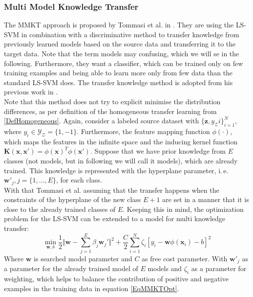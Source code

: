 \subsubsection{Multi Model Knowledge Transfer}
The \acs{MMKT} approach is proposed by Tommasi et al. in \cite{Tommasi.}.
They are using the \ac{LS-SVM} in combination with a discriminative method to transfer knowledge from previously learned models based on the source data and transferring it to the target data.
Note that the term models may confusing, which we will se in the following.
Furthermore, they want a classifier, which can be trained only on few training examples and being able to learn more only from few data than the standard \acs{LS-SVM} does.
The transfer knowledge method is adopted from his previous work in \cite{Tommasi.2009}.\\
Note that this method does not try to explicit minimise the distribution differences, as per definition of the homogeneous transfer learning from \ref{DefHomogeneous}.
Again, consider a labeled source dataset with $\{\mathbf{z},{y_\mathcal{Z}i}\}_{i=1}^{N}$, where $y_i \in \mathcal{Y_Z} =\{1,-1\}$.
Furthermore, the feature mapping function $\phi(\cdot)$, which maps the features in the infinite space and the inducing kernel function $\mathbf{K}(\mathbf{x},\mathbf{x}')=\phi(\mathbf{x})^T\phi(\mathbf{x}')$.
Suppose that we have prior knowledge from $E$ classes (not models, but in following we will call it models), which are already trained.
This knowledge is represented with the hyperplane parameter, i.\,e. $\mathbf{w}'_j, j = \{1,\dots,E\}$, for each class.\cite{Tommasi.}\\
With that Tommasi et al. assuming that the transfer happens when the constraints of the hyperplane of the new class $E+1$ are set in a manner that it is close to the already trained classes of $E$.
Keeping this in mind, the optimization problem for the \acs{LS-SVM} can be extended to a model for multi knowledge transfer:\cite{Tommasi.}
\begin{equation}\label{EqMMKTOpt}
		\min_{\mathbf{w},b} \frac{1}{2}\Vert\mathbf{w}-\sum_{j=1}^{E}\beta_j\mathbf{w}_j'\Vert^2 + \frac{C}{2}\sum_{i=1}^{N}\zeta_i[y_i-\mathbf{w}\phi(\mathbf{x}_i)-b]^2
\end{equation}
Where $\mathbf{w}$ is searched model parameter and $C$ as free cost parameter. With $\mathbf{w}'_j$ as a parameter for the already trained model of $E$ models and $\zeta_i$ as a parameter for weighting, which helps to balance the contribution of positive and negative examples in the training data in equation \eqref{EqMMKTOpt}.
